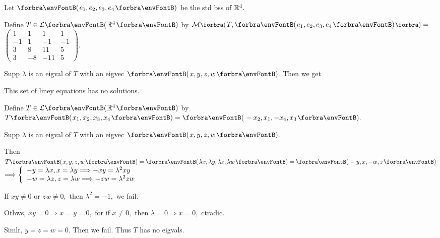 \par\quad
Let $\Par{e_1,e_2,e_3,e_4}$ be the std bss of $\Rbb^4.$\vspace{-6pt}\par\quad
Define $T\in\Lm{\Rbb^4}$ by $\Mt[\BigPar]{T,\Par{e_1,e_2,e_3,e_4}}={}${\normalsize$\begin{pmatrix}
		1 & 1 & 1 & 1\\
		-1 & 1 & -1 & -1\\
		3 & 8 & 11 & 5\\
		3 & -8 & -11 & 5
	\end{pmatrix}.$}\vspace{-12pt}\par\quad
Supp $\lambda$ is an eigval of $T$ with an eigvec $\Par{x,y,z,w}.$ Then we get \vspace{-8pt}\par\quad
This set of liney equations has no solutions.\par\quad
{}\large\par\vspace{6pt}\quad
\Or Define $T\in\Lm{\Rbb^4}$ by $T\Par{x_1,x_2,x_3,x_4}=\Par{-x_2,x_1,-x_4,x_3}.$\par\quad
Supp $\lambda$ is an eigval of $T$ with an eigvec $\Par{x,y,z,w}.$\vspace{-3pt}\par\quad
Then $T\Par{x,y,z,w}=\Par{\lambda x,\lambda y,\lambda z,\lambda w}=\Par{-y,x,-w,z}$ { $\Longrightarrow\MathLeftBrace{l}{
		-y=\lambda x,x=\lambda y\Longrightarrow-xy=\lambda^2 xy\\
		-w=\lambda z,z=\lambda w\Longrightarrow-zw=\lambda^2 zw}$}\vspace{-3pt}\par\quad
If $xy\neq 0$ or $zw\neq 0,$ then $\lambda^2=-1,$ we fail.\par\quad
Othws, $xy=0\Rightarrow x=y=0,$ for if $x\neq 0,$ then $\lambda=0\Rightarrow x=0,$ ctradic.\par\quad
Simlr, $y=z=w=0.$ Then we fail. Thus $T$ has no eigvals.\PfEnd
\SepLine

